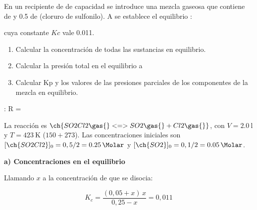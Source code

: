 \begin{exerciseEVAU}
    En un recipiente de  de capacidad se introduce una mezcla gaseosa que contiene  de  y \num{0,5} de  (cloruro de sulfonilo). A  se establece el equilibrio :
    \begin{center}
    \end{center}
    cuya constante \(Kc\) vale \num{0,011}.
    \begin{enumerate}[label=\letraminuscula]
\item Calcular la concentración de todas las sustancias en equilibrio.
\item Calcular la presión total en el equilibrio a 
\item Calcular Kp y los valores de las presiones parciales de los componentes de la mezcla en equilibrio.
    \end{enumerate}

    \datos{}: R = \ctegases


    \begin{solu}

        La reacción es \(\ch{SO2Cl2 \gas{} <=> SO2 \gas{} + Cl2 \gas{}}\), con \(V=\SI{2.0}{\litre}\) y \(T = \SI{423}{\kelvin}\) (\(150+273\)). Las concentraciones iniciales son \([\ch{SO2Cl2}]_0 = 0,5/2 = \SI{0.25}{\Molar}\) y \([\ch{SO2}]_0 = 0,1/2 = \SI{0.05}{\Molar}\).

        \textbf{a) Concentraciones en el equilibrio}

        Llamando \(x\) a la concentración de  que se disocia:

        \begin{equation*}
            K_c = \dfrac{(0,05+x)\, x}{0,25 - x} = 0,011
        \end{equation*}


\end{solu}
\end{exerciseEVAU}
